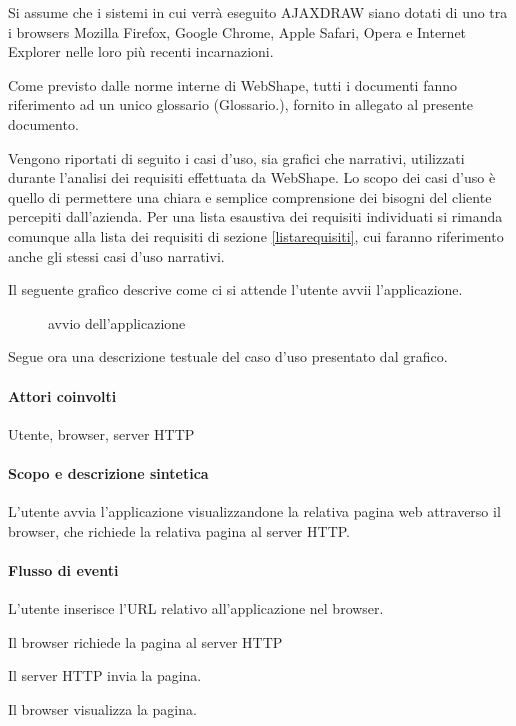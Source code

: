 Si assume che i sistemi in cui verr\`a eseguito AJAXDRAW siano dotati di uno tra i browsers Mozilla Firefox, Google Chrome, Apple Safari, Opera e Internet Explorer nelle loro pi\`u recenti incarnazioni.

Come previsto dalle norme interne di WebShape, tutti i documenti fanno riferimento ad un unico glossario (Glossario.), fornito in allegato al presente documento.

Vengono riportati di seguito i casi d'uso, sia grafici che narrativi, utilizzati durante l'analisi dei requisiti effettuata da WebShape. Lo scopo dei casi d'uso \`e quello di permettere una chiara e semplice comprensione dei bisogni del cliente percepiti dall'azienda. Per una lista esaustiva dei requisiti individuati si rimanda comunque alla lista dei requisiti di sezione \ref{listarequisiti}, cui faranno riferimento anche gli stessi casi d'uso narrativi.

Il seguente grafico descrive come ci si attende l'utente avvii l'applicazione.
\begin{figure}
\centering
\caption{avvio dell'applicazione}
\end{figure}

Segue ora una descrizione testuale del caso d'uso presentato dal grafico.

\paragraph{Attori coinvolti} Utente, browser, server HTTP
\paragraph{Scopo e descrizione sintetica}
L'utente avvia l'applicazione visualizzandone la relativa pagina web attraverso il browser, che richiede la relativa pagina al server HTTP.
\paragraph{Flusso di eventi}
\begin{elenconumerato}[\textbf{}]{\subsubsecindent}
\item L'utente inserisce l'URL relativo all'applicazione nel browser.
\item Il browser richiede la pagina al server HTTP
\item Il server HTTP invia la pagina.
\item Il browser visualizza la pagina.
\end{elenconumerato}
